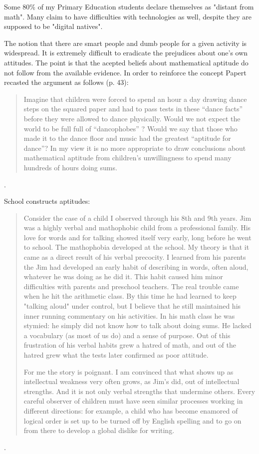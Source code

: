 Some 80\% of my Primary Education students declare themselves as "distant from math". Many claim to have difficulties with technologies as well, despite they are supposed to be "digital natives".

The notion that there are smart people and dumb people for a given activity is widespread. It is extremely difficult to eradicate the prejudices about one's own attitudes. The point is that the acepted beliefs about mathematical aptitude do not follow from the available evidence. In order to reinforce the concept Papert recasted the argument as follows \cite{Papert} (p. 43):

\begin{quote}
Imagine that children were forced to spend an hour a day drawing dance steps on the squared paper and had to pass tests in these “dance facts” before they were allowed to dance physically. Would we not expect the world to be full  full of “dancophobes” ? Would we say that those who made it to the dance floor and music had the greatest “aptitude for dance”? In my view it is no more appropriate to draw conclusions about mathematical aptitude from children's unwillingness to spend many hundreds of hours doing sums.
\end{quote}.  

School constructs aptitudes:

\begin{quote}
Consider the case of a child I observed through his 8th and 9th years. Jim was a highly verbal and mathophobic child from a professional family. His love for words and for talking showed itself very early, long before he went to school. The mathophobia developed at the school. My theory is that it came as a direct result of his verbal precocity. I learned from his parents the Jim had developed an early habit of describing in words, often aloud, whatever he was doing as he did it. This habit caused him minor difficulties with parents and preschool teachers. The real trouble came when he hit the arithmetic class. By this time he had learned to keep "talking aloud" under control, but I believe that he still maintained his inner running commentary on his activities. In his math class he was stymied: he simply did not know how to talk about doing sums. He lacked a vocabulary (as most of us do) and a sense of purpose. Out of this frustration of his verbal habits grew a hatred of math, and out of the hatred grew what the tests later confirmed as poor attitude.

For me the story is poignant. I am convinced that what shows up as intellectual weakness very often grows, as Jim's did, out of intellectual strengths. And it is not only verbal strengths that undermine others. Every careful observer of children must have seen similar processes working in different directions: for example, a child who has become enamored of logical order is set up to be turned off by English spelling and to go on from there to develop a global dislike for writing.  
\end{quote}.  

